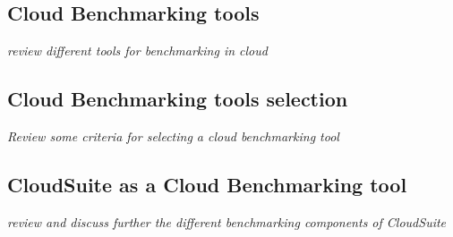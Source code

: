    \subsection{Cloud Benchmarking tools}
    \textit{review different tools for benchmarking in cloud}
    \subsection{Cloud Benchmarking tools selection}
    \textit{Review some criteria for selecting a cloud benchmarking tool}
    \subsection{CloudSuite as a Cloud Benchmarking tool}
    \textit{review and discuss further the different benchmarking components of CloudSuite}